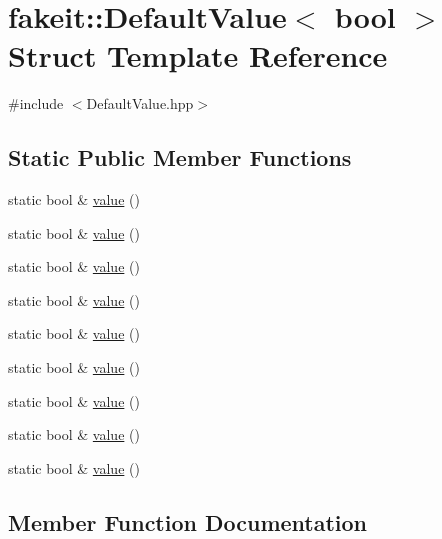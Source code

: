 \hypertarget{structfakeit_1_1DefaultValue_3_01bool_01_4}{}\section{fakeit\+::Default\+Value$<$ bool $>$ Struct Template Reference}
\label{structfakeit_1_1DefaultValue_3_01bool_01_4}


{\ttfamily \#include $<$Default\+Value.\+hpp$>$}

\subsection*{Static Public Member Functions}
\begin{DoxyCompactItemize}
\item 
static bool \& \mbox{\hyperlink{structfakeit_1_1DefaultValue_3_01bool_01_4_a75acaf4263452b9ee596cbedda0c7ee1}{value}} ()
\item 
static bool \& \mbox{\hyperlink{structfakeit_1_1DefaultValue_3_01bool_01_4_a75acaf4263452b9ee596cbedda0c7ee1}{value}} ()
\item 
static bool \& \mbox{\hyperlink{structfakeit_1_1DefaultValue_3_01bool_01_4_a75acaf4263452b9ee596cbedda0c7ee1}{value}} ()
\item 
static bool \& \mbox{\hyperlink{structfakeit_1_1DefaultValue_3_01bool_01_4_a75acaf4263452b9ee596cbedda0c7ee1}{value}} ()
\item 
static bool \& \mbox{\hyperlink{structfakeit_1_1DefaultValue_3_01bool_01_4_a75acaf4263452b9ee596cbedda0c7ee1}{value}} ()
\item 
static bool \& \mbox{\hyperlink{structfakeit_1_1DefaultValue_3_01bool_01_4_a75acaf4263452b9ee596cbedda0c7ee1}{value}} ()
\item 
static bool \& \mbox{\hyperlink{structfakeit_1_1DefaultValue_3_01bool_01_4_a75acaf4263452b9ee596cbedda0c7ee1}{value}} ()
\item 
static bool \& \mbox{\hyperlink{structfakeit_1_1DefaultValue_3_01bool_01_4_a75acaf4263452b9ee596cbedda0c7ee1}{value}} ()
\item 
static bool \& \mbox{\hyperlink{structfakeit_1_1DefaultValue_3_01bool_01_4_a75acaf4263452b9ee596cbedda0c7ee1}{value}} ()
\end{DoxyCompactItemize}


\subsection{Member Function Documentation}
\mbox{\label{structfakeit_1_1DefaultValue_3_01bool_01_4_a75acaf4263452b9ee596cbedda0c7ee1}} 
